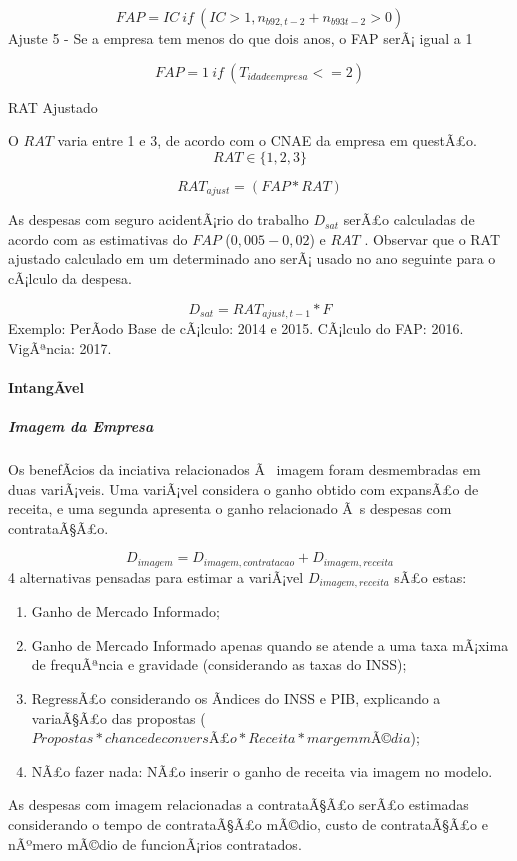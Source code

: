 \documentclass[]{article}
\let\oldparagraph\paragraph
\renewcommand{\paragraph}[1]{\oldparagraph{#1}\mbox{}}
\let\oldsubparagraph\subparagraph
\renewcommand{\subparagraph}[1]{\oldsubparagraph{#1}\mbox{}}
\begin{document}
\[FAP = IC  \ if \ (IC > 1, n_{b92,t-2}+n_{b93t-2} > 0) \] Ajuste 5 - Se
a empresa tem menos do que dois anos, o FAP serÃ¡ igual a 1

\[FAP = 1  \ if \ (T_{idadeempresa} <= 2) \]

RAT Ajustado

O \(RAT\) varia entre 1 e 3, de acordo com o CNAE da empresa em
questÃ£o. \[RAT \in \{1,2,3\}\]

\[RAT_{ajust} = (FAP * RAT)\]

As despesas com seguro acidentÃ¡rio do trabalho \(D_{sat}\) serÃ£o
calculadas de acordo com as estimativas do \(FAP\) (\(0,005 - 0,02\)) e
\(RAT\) . Observar que o RAT ajustado calculado em um determinado ano
serÃ¡ usado no ano seguinte para o cÃ¡lculo da despesa.

\[D_{sat} = RAT_{ajust,t-1}* F\] Exemplo: PerÃ­odo Base de cÃ¡lculo:
2014 e 2015. CÃ¡lculo do FAP: 2016. VigÃªncia: 2017.

\paragraph{IntangÃ­vel}\label{intangavel}

\subparagraph{Imagem da Empresa}\label{imagem-da-empresa}

Os benefÃ­cios da inciativa relacionados Ã~ imagem foram desmembradas em
duas variÃ¡veis. Uma variÃ¡vel considera o ganho obtido com expansÃ£o de
receita, e uma segunda apresenta o ganho relacionado Ã~s despesas com
contrataÃ§Ã£o.

\[D_{imagem}  = D_{imagem, contratacao} + D_{imagem, receita}\] 4
alternativas pensadas para estimar a variÃ¡vel \(D_{imagem, receita}\)
sÃ£o estas:

\begin{enumerate}
\def\labelenumi{\Alph{enumi})}
\item
  Ganho de Mercado Informado;
\item
  Ganho de Mercado Informado apenas quando se atende a uma taxa mÃ¡xima
  de frequÃªncia e gravidade (considerando as taxas do INSS);
\item
  RegressÃ£o considerando os Ã­ndices do INSS e PIB, explicando a
  variaÃ§Ã£o das propostas
  (\(Propostas * chance de conversÃ£o * Receita * margem mÃ©dia\));
\item
  NÃ£o fazer nada: NÃ£o inserir o ganho de receita via imagem no modelo.
\end{enumerate}

As despesas com imagem relacionadas a contrataÃ§Ã£o serÃ£o estimadas
considerando o tempo de contrataÃ§Ã£o mÃ©dio, custo de contrataÃ§Ã£o e
nÃºmero mÃ©dio de funcionÃ¡rios contratados.
\end{document}
